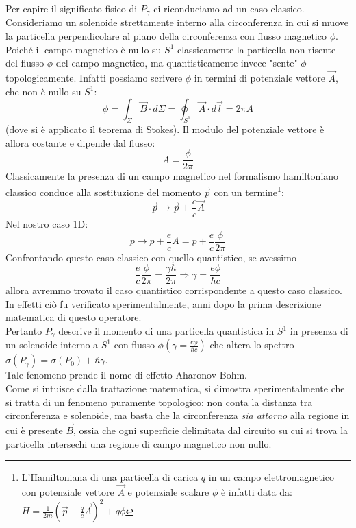 \documentclass[../../FisicaTeorica.tex]{subfiles}
\begin{document}
Per capire il significato fisico di $P_\gamma$ ci riconduciamo ad un caso classico. Consideriamo un solenoide strettamente interno alla circonferenza in cui si muove la particella perpendicolare al piano della circonferenza con flusso magnetico $\phi$.\\
Poiché il campo magnetico è nullo su $S^1$ classicamente la particella non risente del flusso $\phi$  del campo magnetico, ma quantisticamente invece "sente" $\phi$  topologicamente. Infatti possiamo scrivere $\phi$ in termini di potenziale vettore $\vec{A}$, che non è nullo su $S^1$:
\[
\phi =\int_{\Sigma}{\vec{B}\cdot d\Sigma=\oint_{S^1}{\vec{A}\cdot d\vec{l}}}=2\pi A
\]
(dove si è applicato il teorema di Stokes). Il modulo del potenziale vettore è allora costante e dipende dal flusso:
\[
A=\frac{\phi}{2\pi}
\]
Classicamente la presenza di un campo magnetico nel formalismo hamiltoniano classico conduce alla sostituzione del momento $\vec{p}$ con un termine\footnote{L'Hamiltoniana di una particella di carica $q$ in un campo elettromagnetico con potenziale vettore $\vec{A}$ e potenziale scalare $\phi$ è infatti data da: $H = \frac{1}{2m}\left(\vec{p}-\frac{q}{c}\vec{A}\right )^2 +q\phi$}:
\[
\vec{p}\rightarrow \vec{p}+\frac{e}{c} \vec{A}
\]
Nel nostro caso 1D:
\[
p\rightarrow p+\frac{e}{c}A=p+\frac{e}{c}\frac{\phi}{2\pi}
\]%
Confrontando questo caso classico con quello quantistico, se avessimo
\[
\frac{e}{c}\frac{\phi}{2\pi} = \frac{\gamma\hbar}{2\pi} \Rightarrow 
\gamma =\frac{e\phi}{\hbar c} 
\]
allora avremmo trovato il caso quantistico corrispondente a questo caso classico. In effetti ciò fu verificato sperimentalmente, anni dopo la prima descrizione matematica di questo operatore.\\
Pertanto $P_\gamma$ descrive il momento di una particella quantistica in $S^1$ in presenza di un solenoide interno a $S^1$ con flusso $\phi (\gamma =\frac{e\phi}{\hbar c})$ che altera lo spettro $\sigma \left(P_\gamma\right)=\sigma\left(P_0\right)+\hbar \gamma$.\\
Tale fenomeno prende il nome di effetto Aharonov-Bohm.\\ Come si intuisce dalla trattazione matematica, si dimostra sperimentalmente che si tratta di un fenomeno puramente topologico: non conta la distanza tra circonferenza e solenoide, ma basta che la circonferenza \textit{sia attorno} alla regione in cui è presente $\vec{B}$, ossia che ogni superficie delimitata dal circuito su cui si trova la particella intersechi una regione di campo magnetico non nullo.
\end{document}
